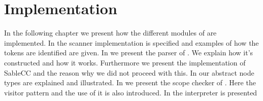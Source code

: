 \chapter{Implementation}
\label{chap:implementation}

In the following chapter we present how the different modules of \productname{} are implemented. In  the scanner implementation is specified and examples of how the tokens are identified are given. In  we present the parser of
\productname{}. We explain how it's constructed and how it works. Furthermore we present the implementation of SableCC and the reason why we did not proceed with this. In  our abstract node types are explained and illustrated. In  we present the scope checker of \productname{}. Here the visitor pattern and the use of it is also introduced. In  the interpreter is presented 










